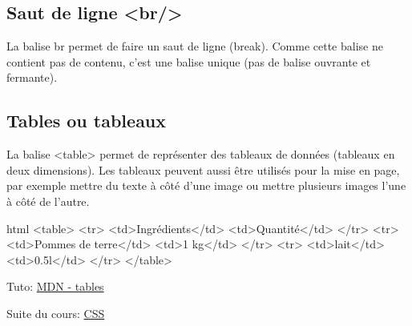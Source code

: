 \documentclass[a4paper,11pt]{article}
\begin{document}
\subsection{Saut de ligne <br/>}
La balise br permet de faire un saut de ligne (break). Comme cette balise ne contient pas de contenu, c'est une balise unique (pas de balise ouvrante et fermante).

\subsection{Tables ou tableaux}
La balise <table> permet de représenter des tableaux de données (tableaux en deux dimensions). Les tableaux peuvent aussi être utilisés pour la mise en page, par exemple mettre du texte à côté d'une image ou mettre plusieurs images l'une à côté de l'autre.
\begin{code}{html}
<table>
  <tr>
    <td>Ingrédients</td>
    <td>Quantité</td>
  </tr>
  <tr>
    <td>Pommes de terre</td>
    <td>1 kg</td>
  </tr>
  <tr>
    <td>lait</td>
    <td>0.5l</td>
  </tr>
</table>
\end{code}
Tuto: \href{https://developer.mozilla.org/fr/docs/Web/HTML/Element/table}{MDN - tables}\par

Suite du cours: \href{http://127.0.0.1:8000/doc/Informatique/CSS}{CSS}
\end{document}

